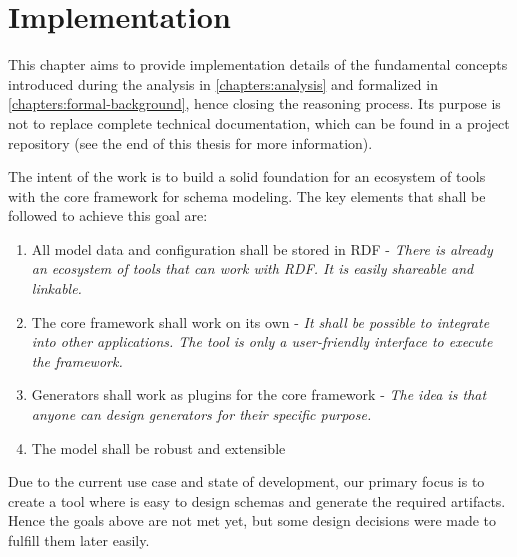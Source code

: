\chapter{Implementation}\label{chapters:implementation}

This chapter aims to provide implementation details of the fundamental concepts introduced during the analysis in \autoref{chapters:analysis} and formalized in \autoref{chapters:formal-background}, hence closing the reasoning process. Its purpose is not to replace complete technical documentation, which can be found in a project repository (see the end of this thesis for more information).

\bigskip

The intent of the work is to build a solid foundation for an ecosystem of tools with the core framework for schema modeling. The key elements that shall be followed to achieve this goal are:
\begin{enumerate}
    \item All model data and configuration shall be stored in RDF - \textit{There is already an ecosystem of tools that can work with RDF. It is easily shareable and linkable.}
    \item The core framework shall work on its own - \textit{It shall be possible to integrate into other applications. The tool is only a user-friendly interface to execute the framework.}
    \item Generators shall work as plugins for the core framework - \textit{The idea is that anyone can design generators for their specific purpose.}
    \item The model shall be robust and extensible
\end{enumerate}

Due to the current use case and state of development, our primary focus is to create a tool where is easy to design schemas and generate the required artifacts. Hence the goals above are not met yet, but some design decisions were made to fulfill them later easily.

